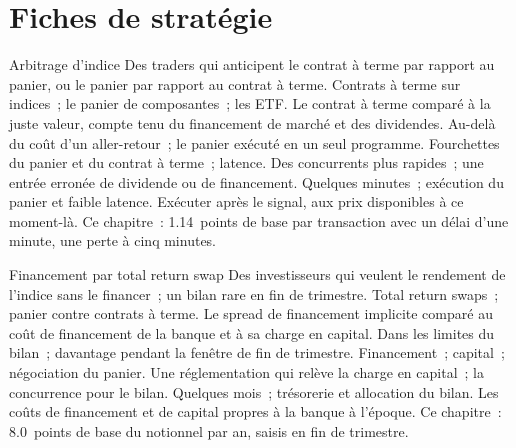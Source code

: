 \section{Fiches de stratégie}

\begin{strategyfile}{Arbitrage d'indice}\label{strat:s2:delta-one-and-dividends:arb}
 Des traders qui anticipent le contrat à terme par rapport au panier, ou le panier par rapport au contrat à terme.
 Contrats à terme sur indices~; le panier de composantes~; les ETF.
 Le contrat à terme comparé à la juste valeur, compte tenu du financement de marché et des dividendes.
 Au-delà du coût d'un aller-retour~; le panier exécuté en un seul programme.
 Fourchettes du panier et du contrat à terme~; latence.
 Des concurrents plus rapides~; une entrée erronée de dividende ou de financement.
 Quelques minutes~; exécution du panier et faible latence.
 Exécuter après le signal, aux prix disponibles à ce moment-là.
 Ce chapitre~: 1.14~points de base par transaction avec un délai d'une minute, une perte à cinq minutes.
\end{strategyfile}

\begin{strategyfile}{Financement par total return swap}\label{strat:s2:delta-one-and-dividends:trs}
 Des investisseurs qui veulent le rendement de l'indice sans le financer~; un bilan rare en fin de trimestre.
 Total return swaps~; panier contre contrats à terme.
 Le spread de financement implicite comparé au coût de financement de la banque et à sa charge en capital.
 Dans les limites du bilan~; davantage pendant la fenêtre de fin de trimestre.
 Financement~; capital~; négociation du panier.
 Une réglementation qui relève la charge en capital~; la concurrence pour le bilan.
 Quelques mois~; trésorerie et allocation du bilan.
 Les coûts de financement et de capital propres à la banque à l'époque.
 Ce chapitre~: 8.0~points de base du notionnel par an, saisis en fin de trimestre.
\end{strategyfile}

